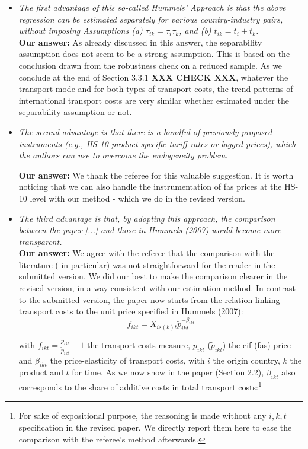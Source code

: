 \documentclass[a4paper,11pt]{article}
\begin{document}
\begin{itemize}
\item \textit{The first advantage of this so-called Hummels' Approach is that the above
regression can be estimated separately for various country-industry pairs, without
imposing Assumptions (a) $\tau_{ik} = \tau_i\tau_{k}$, and (b) $t_{ik} = t_i+ t_{k}$.} \\

\textbf{Our answer:}
As already discussed in this answer, the separability assumption does not seem to be a strong assumption. This is based on the conclusion drawn from the robustness check on a reduced sample. As we conclude at the end of Section 3.3.1 \textbf{XXX CHECK XXX}, whatever the transport mode and for both types of transport costs, the trend patterns of international transport costs are very similar whether estimated under the separability assumption or not.

\item \textit{The second advantage is that there is a handful of previously-proposed instruments (e.g., HS-10 product-specific tariff rates or lagged prices), which the authors can use to overcome the endogeneity problem.}

     \textbf{Our answer:}
We thank the referee for this valuable suggestion. It is worth noticing that we can also handle the instrumentation of fas prices at the HS-10 level with our method - which we do in the revised version.


\item  \textit{The third advantage is that, by adopting this approach, the comparison between the paper [...] and those in Hummels (2007) would become more transparent.}\\
     \textbf{Our answer:}
     We agree with the referee that the comparison with the literature (\citealp{hummels2007} in particular) was not straightforward for the reader in the submitted version. We did our best to make the comparison clearer in the revised version, in a way consistent with our estimation method. In contrast to the submitted version, the paper now starts from the relation linking transport costs to the unit price specified in Hummels (2007):
    \begin{equation}
    f_{ikt} = X_{is(k)t}\widetilde{p}_{ikt}^{-\beta_{ikt}} \label{eq:Hummels}
    \end{equation}

     with $f_{ikt} = \frac{p_{ikt}}{\widetilde{p}_{ikt}} -1 $ the transport costs measure, $p_{ikt}$ ($\widetilde{p}_{ikt}$) the cif (fas) price and $\beta_{ikt}$ the price-elasticity of transport costs, with $i$ the origin country, $k$ the product and $t$ for time. As we now show in the paper (Section 2.2), $\beta_{ikt}$ also corresponds to the share of additive costs in total transport costs:\footnote{For sake of expositional purpose, the reasoning is made without any $i,k,t$ specification in the revised paper. We directly report them here to ease the comparison with the referee's method afterwards.}


\end{itemize}
\end{document}
